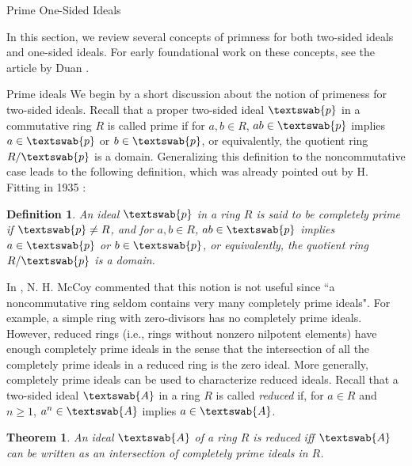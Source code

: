 \documentclass[11pt,a4paper]{article}
\theoremstyle{theorem}
\newtheorem{theorem}{Theorem}[section]
\newtheorem{definition}{Definition}[section]
\numberwithin{equation}{section}
\begin{document}
\begin{section}{Prime One-Sided Ideals}\label{sec: primeness} 

In this section, we review several concepts of primness for both two-sided ideals and one-sided ideals. For early foundational work on these concepts, see   the article by Duan \cite{dauns1973one}. 
	\begin{subsection}{Prime ideals}
		We begin by a short discussion about the notion of primeness for two-sided ideals. Recall that a proper two-sided ideal \( \textswab{p} \) in a commutative ring \( R \) is called  prime if for \( a,b\in R\), \( ab\in \textswab{p}\) implies \( a\in \textswab{p}\) or \( b\in \textswab{p}\), or equivalently, the quotient ring \( R/  \textswab{p}\) is a domain. Generalizing this definition to  the noncommutative case leads to the following definition, which was already pointed out by H. Fitting in 1935 \cite{Fitting1935prim}:
		\begin{definition}\label{def: completely prime ideal}
			An ideal  \( \textswab{p} \) in a  ring \( R \) is said to be \emph{completely prime} if \( \textswab{p} \neq R \), and for \( a,b\in R\), \( ab\in \textswab{p}\) implies \( a\in \textswab{p}\) or \( b\in \textswab{p}\), or equivalently, the quotient ring \( R/  \textswab{p}\) is a domain.
		\end{definition}
		In  \cite{McCoy1949prime}, N. H. McCoy commented that  this notion is not useful since ``a noncommutative ring seldom contains very many completely prime ideals". For example, a simple ring with zero-divisors has no completely prime ideals. However, reduced rings (i.e., rings without nonzero nilpotent elements) have enough completely prime ideals in the sense that the intersection of all the completely prime ideals in a reduced ring is the zero ideal. More generally, completely prime ideals can be used to characterize reduced ideals. Recall that a two-sided ideal  \( \textswab{A} \) in a  ring \( R \) is called \textit{reduced} if, for \(a\in R\) and \(n\geq 1\), \( a^n\in \textswab{A}\) implies \( a\in \textswab{A}\).
		\begin{theorem}\label{thm: reduced ideal as intersection of completely prime ideals}
			An  ideal \( \textswab{A} \) of a ring \( R \) is reduced iff \( \textswab{A} \) can be written as an intersection of completely prime ideals in \( R \).

\end{theorem}
\end{subsection}
\end{section}
\end{document}

